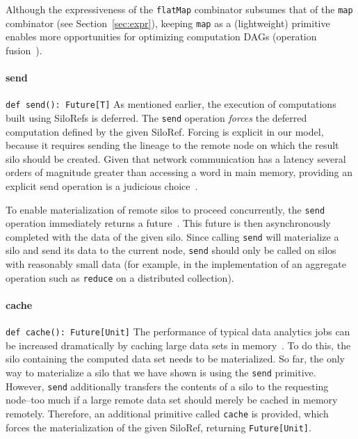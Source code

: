 \documentclass{jfp1}
\begin{document}
Although the expressiveness of the \verb|flatMap| combinator subsumes that of
the \verb|map| combinator (see Section~\ref{sec:expr}), keeping \verb|map| as a
(lightweight) primitive enables more opportunities for optimizing computation
DAGs (\eg operation fusion~\cite{FlumeJava}).

\paragraph{send}%
%
\texttt{def send(): Future[T]} \newline
%
As mentioned earlier, the execution of computations built using SiloRefs is
deferred. The \verb|send| operation {\em forces} the deferred computation
defined by the given SiloRef.  Forcing is explicit in our model, because it
requires sending the lineage to the remote node on which the result silo should
be created. Given that network communication has a latency several orders of
magnitude greater than accessing a word in main memory, providing an explicit
send operation is a judicious choice~\cite{ANoteDistComp}.

To enable materialization of remote silos to proceed concurrently, the
\verb|send| operation immediately returns a future~\cite{Futures}. This future
is then asynchronously completed with the data of the given silo. Since calling
\verb|send| will materialize a silo and send its data to the current node,
\verb|send| should only be called on silos with reasonably small data (for
example, in the implementation of an aggregate operation such as \verb|reduce|
on a distributed collection).

\paragraph{cache}%
%
\texttt{def cache(): Future[Unit]} \newline
%
The performance of typical data analytics jobs can be increased dramatically by
caching large data sets in memory~\cite{Spark}. To do this, the silo containing
the computed data set needs to be materialized. So far, the only way to
materialize a silo that we have shown is using the \verb|send| primitive.
However, \verb|send| additionally transfers the contents of a silo to the
requesting node--too much if a large remote data set should merely be cached in
memory remotely.  Therefore, an additional primitive called \verb|cache| is
provided, which forces the materialization of the given SiloRef, returning
\verb|Future[Unit]|.
\end{document}
